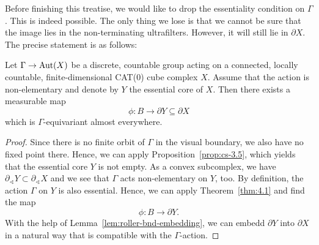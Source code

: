 Before finishing this treatise, we would like to drop the essentiality condition on \(\Gamma\). This is indeed possible. The only thing we lose is that we cannot be sure that the image lies in the non-terminating ultrafilters. However, it will still lie in \(\partial X\). The precise statement is as follows:

\begin{cor}
  \label{cor:4.2}
  Let \(\Gamma \to \operatorname{Aut}(X)\) be a discrete, countable group acting on a connected, locally countable, finite-dimensional CAT(0) cube complex \(X\). Assume that the action is non-elementary and denote by \(Y\) the essential core of \(X\). Then there exists a measurable map
  \[
    \phi \colon B \to \partial Y \subseteq \partial X
  \]
  which is \(\Gamma\)-equivariant almost everywhere.
\end{cor}

\begin{proof}
  Since there is no finite orbit of \(\Gamma\) in the visual boundary, we also have no fixed point there. Hence, we can apply Proposition~\ref{prop:cs-3.5}, which yields that the essential core \(Y\) is not empty. As a convex subcomplex, we have \(\partial_\sphericalangle Y \subset \partial_\sphericalangle X\) and we see that \(\Gamma\) acts non-elementary on \(Y\), too. By definition, the action \(\Gamma\) on \(Y\) is also essential. Hence, we can apply Theorem~\ref{thm:4.1} and find the map
  \[
    \phi\colon B \to \partial Y.
  \]
  With the help of Lemma~\ref{lem:roller-bnd-embedding}, we can embedd \(\partial Y\) into \(\partial X\) in a natural way that is compatible with the \(\Gamma\)-action.
\end{proof}

